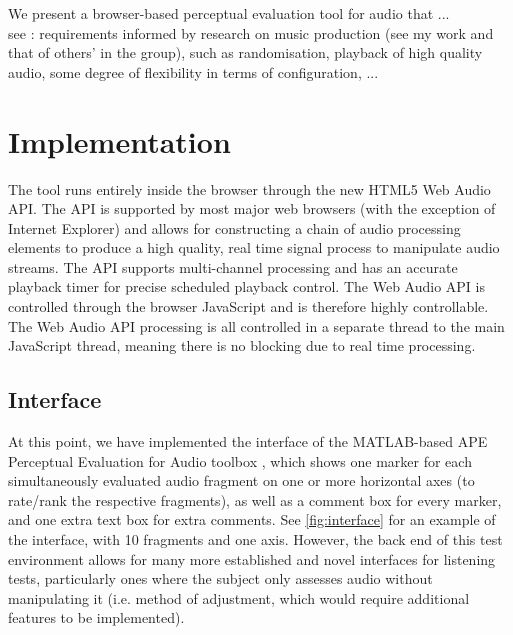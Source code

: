 \documentclass{article}
\begin{document}

We present a browser-based perceptual evaluation tool for audio that ... \\

see \cite{deman2014b}: requirements informed by research on music production (see my work and that of others' in the group), such as randomisation, playback of high quality audio, some degree of flexibility in terms of configuration, ... \\


\section{Implementation}\label{sec:implementation}



The tool runs entirely inside the browser through the new HTML5 Web Audio API. The API is supported by most major web browsers (with the exception of Internet Explorer) and allows for constructing a chain of audio processing elements to produce a high quality, real time signal process to manipulate audio streams. The API supports multi-channel processing and has an accurate playback timer for precise scheduled playback control. The Web Audio API is controlled through the browser JavaScript and is therefore highly controllable. The Web Audio API processing is all controlled in a separate thread to the main JavaScript thread, meaning there is no blocking due to real time processing. 

\subsection{Interface}\label{sec:interface} %

At this point, we have implemented the interface of the MATLAB-based APE Perceptual Evaluation for Audio toolbox \cite{deman2014b}, which shows one marker for each simultaneously evaluated audio fragment on one or more horizontal axes (to rate/rank the respective fragments), as well as a comment box for every marker, and one extra text box for extra comments. See \ref{fig:interface} for an example of the interface, with 10 fragments and one axis. However, the back end of this test environment allows for many more established and novel interfaces for listening tests, particularly ones where the subject only assesses audio without manipulating it (i.e. method of adjustment, which would require additional features to be implemented). 
\end{document}
